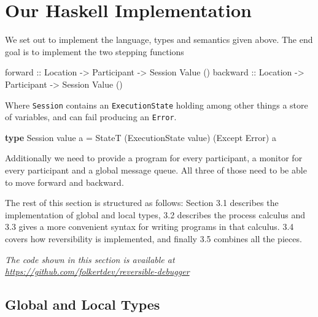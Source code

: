 \documentclass[runningheads]{llncs}
\newenvironment{Shaded}{}{}
\newcommand{\KeywordTok}[1]{\textcolor[rgb]{0.00,0.44,0.13}{\textbf{#1}}}
\newcommand{\DataTypeTok}[1]{\textcolor[rgb]{0.56,0.13,0.00}{#1}}
\newcommand{\OtherTok}[1]{\textcolor[rgb]{0.00,0.44,0.13}{#1}}
\newcommand{\FunctionTok}[1]{\textcolor[rgb]{0.02,0.16,0.49}{#1}}
\newcommand{\NormalTok}[1]{#1}
\begin{document}
\section{Our Haskell Implementation}\label{our-haskell-implementation}

We set out to implement the language, types and semantics given above.
The end goal is to implement the two stepping functions

\begin{Shaded}
\begin{Highlighting}[]
\OtherTok{forward ::} \DataTypeTok{Location} \OtherTok{->} \DataTypeTok{Participant} \OtherTok{->} \DataTypeTok{Session} \DataTypeTok{Value}\NormalTok{ ()}
\OtherTok{backward ::} \DataTypeTok{Location} \OtherTok{->} \DataTypeTok{Participant} \OtherTok{->} \DataTypeTok{Session} \DataTypeTok{Value}\NormalTok{ ()}
\end{Highlighting}
\end{Shaded}

Where \texttt{Session} contains an \texttt{ExecutionState} holding among
other things a store of variables, and can fail producing an
\texttt{Error}.

\begin{Shaded}
\begin{Highlighting}[]
\KeywordTok{type} \DataTypeTok{Session}\NormalTok{ value a }\FunctionTok{=} \DataTypeTok{StateT}\NormalTok{ (}\DataTypeTok{ExecutionState}\NormalTok{ value) (}\DataTypeTok{Except} \DataTypeTok{Error}\NormalTok{) a}
\end{Highlighting}
\end{Shaded}

Additionally we need to provide a program for every participant, a
monitor for every participant and a global message queue. All three of
those need to be able to move forward and backward.

The rest of this section is structured as follows: Section 3.1 describes
the implementation of global and local types, 3.2 describes the process
calculus and 3.3 gives a more convenient syntax for writing programs in
that calculus. 3.4 covers how reversibility is implemented, and finally
3.5 combines all the pieces.

\emph{The code shown in this section is available at
\url{https://github.com/folkertdev/reversible-debugger}}

\subsection{Global and Local Types}\label{global-and-local-types}
\end{document}

